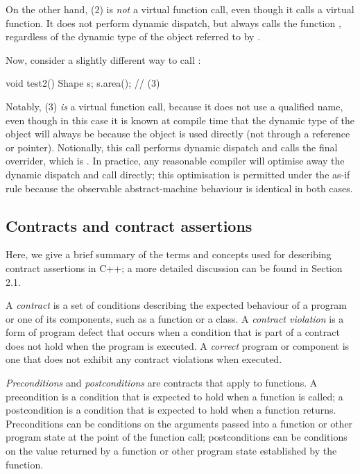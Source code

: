On the other hand, (2) is \emph{not} a virtual function call, even though it calls a virtual function. It does not perform dynamic dispatch, but always calls the function , regardless of the dynamic type of the object referred to by .

Now, consider a slightly different way to call :

\begin{codeblock}
void test2() {
  Shape s;
  s.area(); // (3)
}
\end{codeblock}

Notably, (3) \emph{is} a virtual function call, because it does not use a qualified name, even though in this case it is known at compile time that the dynamic type of the object  will always be  because the object is used directly (not through a reference or pointer). Notionally, this call performs dynamic dispatch and calls the final overrider, which is . In practice, any reasonable compiler will optimise away the dynamic dispatch and call  directly; this optimisation is permitted under the as-if rule because the observable abstract-machine behaviour is identical in both cases.

\subsection{Contracts and contract assertions}

Here, we give a brief summary of the terms and concepts used for describing contract assertions in C++; a more detailed discussion can be found in \cite{P2900R14} Section 2.1.

A \emph{contract} is a set of conditions describing the expected behaviour of a program or one of its components, such as a function or a class. A \emph{contract violation} is a form of program defect that occurs when a condition that is part of a contract does not hold when the program is executed. A \emph{correct} program or component is one that does not exhibit any contract violations when executed.

\emph{Preconditions} and \emph{postconditions} are contracts that apply to functions. A precondition is a condition that is expected to hold when a function is called; a postcondition is a condition that is expected to hold when a function returns. Preconditions can be conditions on the arguments passed into a function or other program state at the point of the function call; postconditions can be conditions on the value returned by a function or other program state established by the function.

